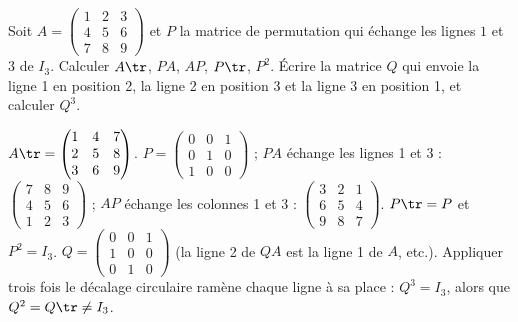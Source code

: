 \begin{exo}
Soit $A=\begin{pmatrix}1&2&3\\4&5&6\\7&8&9\end{pmatrix}$ et $P$ la matrice de permutation qui échange les lignes $1$ et $3$ de $I_3$. Calculer $A\tr$, $PA$, $AP$, $P\tr$, $P^2$. Écrire la matrice $Q$ qui envoie la ligne 1 en position 2, la ligne 2 en position 3 et la ligne 3 en position 1, et calculer $Q^3$.
\begin{corrige}
$A\tr=\begin{pmatrix}1&4&7\\2&5&8\\3&6&9\end{pmatrix}$. $P=\begin{pmatrix}0&0&1\\0&1&0\\1&0&0\end{pmatrix}$ ; $PA$ échange les lignes 1 et 3 : $\begin{pmatrix}7&8&9\\4&5&6\\1&2&3\end{pmatrix}$ ; $AP$ échange les colonnes 1 et 3 : $\begin{pmatrix}3&2&1\\6&5&4\\9&8&7\end{pmatrix}$. $P\tr=P$ et $P^2=I_3$. $Q=\begin{pmatrix}0&0&1\\1&0&0\\0&1&0\end{pmatrix}$ (la ligne 2 de $QA$ est la ligne 1 de $A$, etc.). Appliquer trois fois le décalage circulaire ramène chaque ligne à sa place : $Q^3=I_3$, alors que $Q^2=Q\tr\neq I_3$.
\end{corrige}
\end{exo}
